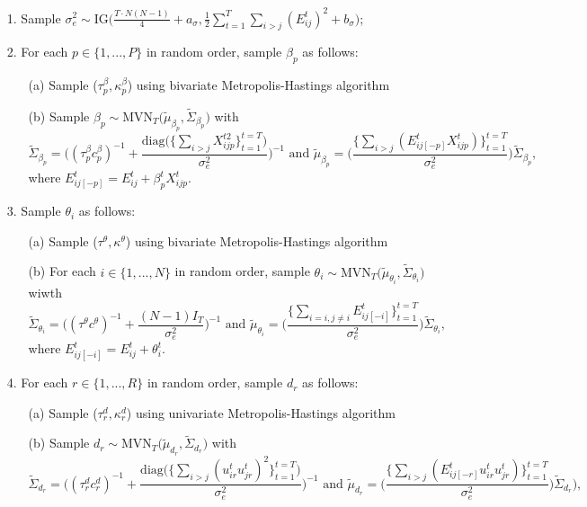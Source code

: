 \documentclass[a4paper]{article}
\begin{document}
	\begin{itemize}
		\item [1.] Sample $\sigma_e^2 \sim \mbox{IG}\big(\frac{T\cdot N(N-1)}{4}+a_\sigma, \frac{1}{2}\sum\limits_{t=1}^T\sum\limits_{i> j}(E^t_{ij})^2 + b_\sigma\big)$;
		\item [2.] For each $p \in \{1,...,P\}$ in random order, sample $\beta_{p}$ as follows:
		\begin{enumerate} 
			\item [(a)] Sample ($\tau^{\beta}_p ,  \kappa^\beta_p$) using bivariate Metropolis-Hastings algorithm
			\item [(b)] Sample $\beta_{p} \sim \mbox{MVN}_T\big(\tilde{\mu}_{\beta_p}, \tilde{\Sigma}_{\beta_p} \big)$ with 
			$$\tilde{\Sigma}_{\beta_p} = \Big((\tau^{\beta}_pc^\beta_p)^{-1}+\frac{\mbox{diag}\big(\{\sum_{i>j}{X^{t2}_{ijp}}\}_{t=1}^{t=T}\big)}{\sigma_e^2}\Big)^{-1} \mbox{ and } \tilde{\mu}_{\beta_p} =  \Big(\frac{\{\sum_{i>j}(E^{t}_{ij[-p]}X^t_{ijp})\}_{t=1}^{t=T}}{\sigma_e^2}\Big)\tilde{\Sigma}_{\beta_p},$$ 
			where $E^{t}_{ij[-p]}=E^t_{ij}+\beta^t_{p}X^{t}_{ijp}$.						
		\end{enumerate}
		\item [3.] Sample $\theta_{i}$ as follows:
		\begin{enumerate}
			\item [(a)] Sample ($\tau^{\theta},  \kappa^\theta$) using bivariate Metropolis-Hastings algorithm
			\item [(b)] For each $i \in \{1,...,N\}$ in random order, sample $\theta_{i} \sim \mbox{MVN}_T\big(\tilde{\mu}_{\theta_i}, \tilde{\Sigma}_{\theta_i} \big)$ wiwth
			$$\tilde{\Sigma}_{\theta_i} = \Big((\tau^\theta c^\theta)^{-1}+\frac{(N-1)I_T}{\sigma_e^2}\Big)^{-1} \mbox{ and }
			\tilde{\mu}_{\theta_i} = \Big(\frac{\{\sum_{i=i, j\neq i}E^{t}_{ij[-i]}\}_{t=1}^{t=T}}{\sigma_e^2}\Big)\tilde{\Sigma}_{\theta_i},$$ where $E^{t}_{ij[-i]}=E^t_{ij}+\theta^t_{i}.$
		\end{enumerate}
		\item [4.] For each $r \in \{1,...,R\}$ in random order, sample $d_{r}$ as follows:
		\begin{enumerate}
			\item [(a)] Sample  ($\tau_r^{d},  \kappa_r^d$)  using univariate Metropolis-Hastings algorithm 
			\item [(b)] Sample $d_{r} \sim \mbox{MVN}_T\big(\tilde{\mu}_{d_r}, \tilde{\Sigma}_{d_r} \big)$ with
			$$\tilde{\Sigma}_{d_r} = \Big((\tau_r^d{c_r^d})^{-1}+\frac{\mbox{diag}\big(\{\sum_{i>j}({u^t_{ir}u^t_{jr}})^2\}_{t=1}^{t=T}\big)}{\sigma_e^2}\Big)^{-1} \mbox{ and } \tilde{\mu}_{d_r} =  \Big(\frac{\{\sum_{i>j}(E^{t}_{ij[-r]}u^t_{ir}u^t_{jr})\}_{t=1}^{t=T}}{\sigma_e^2}\Big)\tilde{\Sigma}_{d_r}),$$

\end{enumerate}
\end{itemize}
\end{document}
